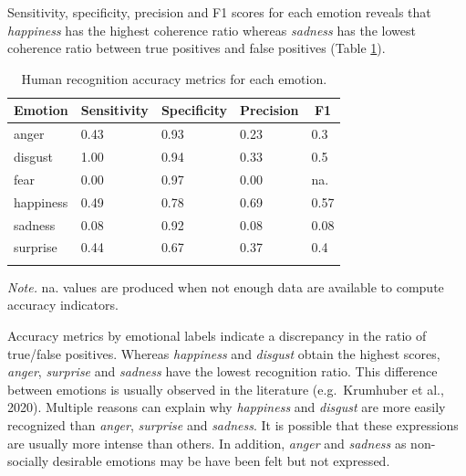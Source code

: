 \documentclass[
  english,
  man]{apa7}
\begin{document}
Sensitivity, specificity, precision and F1 scores for each emotion reveals that \emph{happiness} has the highest coherence ratio whereas \emph{sadness} has the lowest coherence ratio between true positives and false positives (Table \ref{tab:confusionTable-sr-hr}).

\begin{table}[tbp]

\begin{center}
\begin{threeparttable}

\caption{\label{tab:confusionTable-sr-hr}Human recognition accuracy metrics for each emotion.}

\begin{tabular}{lllll}
\toprule
Emotion & \multicolumn{1}{c}{Sensitivity} & \multicolumn{1}{c}{Specificity} & \multicolumn{1}{c}{Precision} & \multicolumn{1}{c}{F1}\\
\midrule
anger & 0.43 & 0.93 & 0.23 & 0.3\\
disgust & 1.00 & 0.94 & 0.33 & 0.5\\
fear & 0.00 & 0.97 & 0.00 & na.\\
happiness & 0.49 & 0.78 & 0.69 & 0.57\\
sadness & 0.08 & 0.92 & 0.08 & 0.08\\
surprise & 0.44 & 0.67 & 0.37 & 0.4\\
\bottomrule
\addlinespace
\end{tabular}

\begin{tablenotes}[para]
\normalsize{\textit{Note.} na. values are produced when not enough data are available to compute accuracy indicators.}
\end{tablenotes}

\end{threeparttable}
\end{center}

\end{table}

Accuracy metrics by emotional labels indicate a discrepancy in the ratio of true/false positives. Whereas \emph{happiness} and \emph{disgust} obtain the highest scores, \emph{anger}, \emph{surprise} and \emph{sadness} have the lowest recognition ratio. This difference between emotions is usually observed in the literature (e.g.~Krumhuber et al., 2020). Multiple reasons can explain why \emph{happiness} and \emph{disgust} are more easily recognized than \emph{anger}, \emph{surprise} and \emph{sadness}. It is possible that these expressions are usually more intense than others. In addition, \emph{anger} and \emph{sadness} as non-socially desirable emotions may be have been felt but not expressed.
\end{document}
